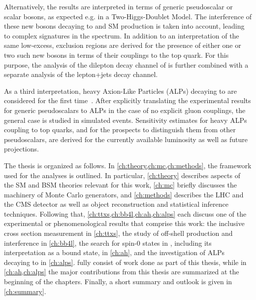 Alternatively, the results are interpreted in terms of generic pseudoscalar or scalar bosons, as expected e.g. in a Two-Higgs-Doublet Model. The interference of these new bosons decaying to \ttbar and SM \ttbar production is taken into account, leading to complex signatures in the \mtt spectrum. In addition to an interpretation of the same low-\mtt excess, exclusion regions are derived for the presence of either one or two such new bosons in terms of their couplings to the top quark. For this purpose, the analysis of the dilepton decay channel of \ttbar is further combined with a separate analysis of the lepton+jets decay channel.

As a third interpretation, heavy Axion-Like Particles (ALPs) decaying to \ttbar are considered for the first time~\cite{Jeppe:2024sxt}. After explicitly translating the experimental results for generic pseudoscalars to ALPs in the case of no explicit gluon couplings, the general case is studied in simulated events. Sensitivity estimates for heavy ALPs coupling to top quarks, and for the prospects to distinguish them from other pseudoscalars, are derived for the currently available luminosity as well as future projections.

\medskip

The thesis is organized as follows. In \cref{ch:theory,ch:mc,ch:methods}, the framework used for the analyses is outlined. In particular, \cref{ch:theory} describes aspects of the SM and BSM theories relevant for this work, \cref{ch:mc} briefly discusses the machinery of Monte Carlo generators, and \cref{ch:methods} describes the LHC and the CMS detector as well as object reconstruction and statistical inference techniques. Following that, \cref{ch:ttxs,ch:bb4l,ch:ah,ch:alps} each discuss one of the experimental or phenomenological results that comprise this work: the inclusive \ttbar cross section measurement in \cref{ch:ttxs}, the study of off-shell \ttbar production and \tttW interference in \cref{ch:bb4l}, the search for spin-0 states in \ttbar, including its interpretation as a \ttbar bound state, in \cref{ch:ah}, and the investigation of ALPs decaying to \ttbar in \cref{ch:alps}.  fully consist of work done as part of this thesis, while in \cref{ch:ah,ch:alps} the major contributions from this thesis are summarized at the beginning of the chapters. Finally, a short summary and outlook is given in \cref{ch:summary}.




